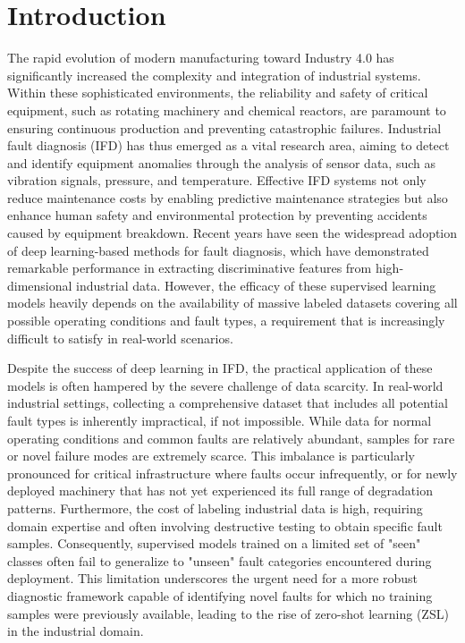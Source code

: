 \section{Introduction}
\label{sec:intro}

The rapid evolution of modern manufacturing toward Industry 4.0 has significantly increased the complexity and integration of industrial systems. Within these sophisticated environments, the reliability and safety of critical equipment, such as rotating machinery and chemical reactors, are paramount to ensuring continuous production and preventing catastrophic failures. Industrial fault diagnosis (IFD) has thus emerged as a vital research area, aiming to detect and identify equipment anomalies through the analysis of sensor data, such as vibration signals, pressure, and temperature. Effective IFD systems not only reduce maintenance costs by enabling predictive maintenance strategies but also enhance human safety and environmental protection by preventing accidents caused by equipment breakdown. Recent years have seen the widespread adoption of deep learning-based methods for fault diagnosis, which have demonstrated remarkable performance in extracting discriminative features from high-dimensional industrial data. However, the efficacy of these supervised learning models heavily depends on the availability of massive labeled datasets covering all possible operating conditions and fault types, a requirement that is increasingly difficult to satisfy in real-world scenarios.

Despite the success of deep learning in IFD, the practical application of these models is often hampered by the severe challenge of data scarcity. In real-world industrial settings, collecting a comprehensive dataset that includes all potential fault types is inherently impractical, if not impossible. While data for normal operating conditions and common faults are relatively abundant, samples for rare or novel failure modes are extremely scarce. This imbalance is particularly pronounced for critical infrastructure where faults occur infrequently, or for newly deployed machinery that has not yet experienced its full range of degradation patterns. Furthermore, the cost of labeling industrial data is high, requiring domain expertise and often involving destructive testing to obtain specific fault samples. Consequently, supervised models trained on a limited set of "seen" classes often fail to generalize to "unseen" fault categories encountered during deployment. This limitation underscores the urgent need for a more robust diagnostic framework capable of identifying novel faults for which no training samples were previously available, leading to the rise of zero-shot learning (ZSL) in the industrial domain.

